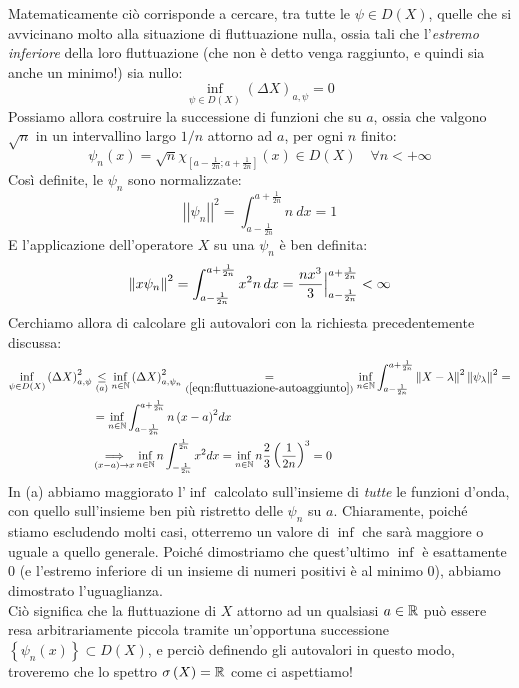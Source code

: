 \documentclass[../../FisicaTeorica.tex]{subfiles}
\begin{document}
Matematicamente ciò corrisponde a cercare, tra tutte le $\psi \in D(X)$, quelle che si avvicinano molto alla situazione di fluttuazione nulla, ossia tali che l'\textit{estremo inferiore} della loro fluttuazione (che non è detto venga raggiunto, e quindi sia anche un minimo!) sia nullo:
\[
\inf_{\psi\in D\left(X\right)}{\left(\Delta X\right)_{a,\psi}}=0
\]
Possiamo allora costruire la successione di funzioni che  su $a$, ossia che valgono $\sqrt{n}$ in un intervallino largo $1/n$ attorno ad $a$, per ogni $n$ finito:
\[
\psi_n\left(x\right)=\sqrt n \chi_{\left[a-\frac{1}{2n};a+\frac{1}{2n}\right]}\left(x\right)\in D\left(X\right) \quad \forall n < +\infty
\]
Così definite, le $\psi_n$ sono normalizzate:
\[
\left|\left|\psi_n\right|\right|^2= \int_{a-\frac{1}{2n}}^{a+\frac{1}{2n}}{n\ dx}=1
\]
E l'applicazione dell'operatore $X$ su una $\psi_n$ è ben definita:
\[
\norm{x\psi_n}^2 = \int_{a-\frac{1}{2n}}^{a+\frac{1}{2n}} x^2 n\,dx = \frac{nx^3}{3}\Big |^{a+\frac{1}{2n}}_{a-\frac{1}{2n}} < \infty
\]
Cerchiamo allora di calcolare gli autovalori con la richiesta  precedentemente discussa:
\begin{align*}
\inf_{\psi\in D\left(X\right)}{\left(\Delta X\right)_{a,\psi}^2}&\underset{(a)}{\leq} \inf_{n\in \bb{N}}{\left(\Delta X\right)_{a,\psi_n}^2} \underset{(\ref{eqn:fluttuazione-autoaggiunto})}{=}
\inf_{n\in\bb{N}}\int_{a-\frac{1}{2n}}^{a+\frac{1}{2n}} \norm{X-\lambda}^2 \norm{\psi_\lambda}^2 = \\
&= \inf_{n\in\bb{N}}{\int_{a-\frac{1}{2n}}^{a+\frac{1}{2n}}{{n\left(x-a\right)}^2dx}} \\
&\xRightarrow[(x-a)\to x]{} \inf_{n\in\bb{N}}{n\int_{-\frac{1}{2n}}^{\frac{1}{2n}}{x^2dx}=\inf_{n\in\bb{N}}{n\frac{2}{3}\left(\frac{1}{2n}\right)^3}}=0
\end{align*}
In (a) abbiamo maggiorato l'$\inf$ calcolato sull'insieme di \textit{tutte} le funzioni d'onda, con quello sull'insieme ben più ristretto delle $\psi_n$  su $a$. Chiaramente, poiché stiamo escludendo molti casi, otterremo un valore di $\inf$ che sarà maggiore o uguale a quello generale. Poiché dimostriamo che quest'ultimo $\inf$ è esattamente $0$ (e l'estremo inferiore di un insieme di numeri positivi è al minimo $0$), abbiamo dimostrato l'uguaglianza.\\
Ciò significa che la fluttuazione di $X$ attorno ad un qualsiasi $a\in \bb{R}$ può essere resa arbitrariamente piccola tramite un'opportuna successione $\left\{\psi_n(x)\right\}\subset D\left(X\right)$, e perciò definendo gli autovalori in questo modo, troveremo che lo spettro $\sigma \left(X\right)=\bb{R}$ come ci aspettiamo!\\
\end{document}
